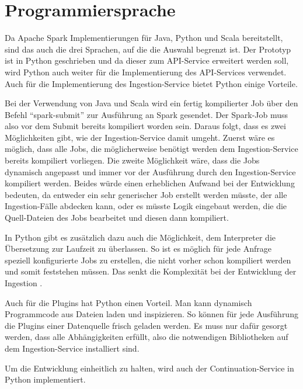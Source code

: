 \section{Programmiersprache}

Da Apache Spark Implementierungen für Java, Python und Scala bereitstellt, sind das auch die drei Sprachen, auf die die Auswahl begrenzt ist.
Der Prototyp ist in Python geschrieben und da dieser zum API-Service erweitert werden soll, wird Python auch weiter für die Implementierung des API-Services verwendet.
Auch für die Implementierung des Ingestion-Service bietet Python einige Vorteile.

Bei der Verwendung von Java und Scala wird ein fertig kompilierter Job über den Befehl "`spark-submit"' zur Ausführung an Spark gesendet.
Der Spark-Job muss also vor dem Submit bereits kompiliert worden sein.
Daraus folgt, dass es zwei Möglichkeiten gibt, wie der Ingestion-Service damit umgeht.
Zuerst wäre es möglich, dass alle Jobs, die möglicherweise benötigt werden dem Ingestion-Service bereits kompiliert vorliegen.
Die zweite Möglichkeit wäre, dass die Jobs dynamisch angepasst und immer vor der Ausführung durch den Ingestion-Service kompiliert werden.
Beides würde einen erheblichen Aufwand bei der Entwicklung bedeuten, da entweder ein sehr generischer Job erstellt werden müsste, der alle Ingestion-Fälle abdecken kann, oder es müsste Logik eingebaut werden, die die Quell-Dateien des Jobs bearbeitet und diesen dann kompiliert.

In Python gibt es zusätzlich dazu auch die Möglichkeit, dem Interpreter die Übersetzung zur Laufzeit zu überlassen.
So ist es möglich für jede Anfrage speziell konfigurierte Jobs zu erstellen, die nicht vorher schon kompiliert werden und somit feststehen müssen.
Das senkt die Komplexität bei der Entwicklung der Ingestion \parencite{pyspark-int}.

Auch für die Plugins hat Python einen Vorteil.
Man kann dynamisch Programmcode aus Dateien laden und inspizieren.
So können für jede Ausführung die Plugins einer Datenquelle frisch geladen werden.
Es muss nur dafür gesorgt werden, dass alle Abhängigkeiten erfüllt, also die notwendigen Bibliotheken auf dem Ingestion-Service installiert sind.

Um die Entwicklung einheitlich zu halten, wird auch der Continuation-Service in Python implementiert.